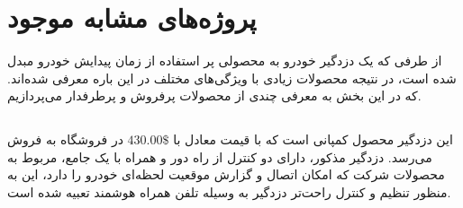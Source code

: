 \documentclass[a4paper,12pt]{report}
\begin{document}
	\section{
	پروژه‌های مشابه موجود
	}\label{sec3:chap1}
	از طرفی که یک دزدگیر خودرو به محصولی پر استفاده از زمان پیدایش خودرو مبدل شده است، در نتیجه محصولات زیادی با ویژگی‌های مختلف در این باره معرفی شده‌اند. که در این بخش به معرفی چندی از محصولات پرفروش و پرطرفدار می‌پردازیم.
	\subsection{
	}\label{subsec1:sec3:chap1}
	این دزدگیر محصول کمپانی
	است که با قیمت معادل با
	$430.00\$$
	در فروشگاه
		به فروش می‌رسد.
	دزدگیر مذکور، دارای دو کنترل از راه دور و همراه با یک
	جامع، مربوط به محصولات شرکت
		که امکان اتصال و گزارش موقعیت لحظه‌ای خودرو را دارد، این
	به منظور تنظیم و کنترل راحت‌تر دزدگیر به وسیله تلفن همراه هوشمند تعبیه شده است.
	\cite{ViperCar35:online}
\end{document}
